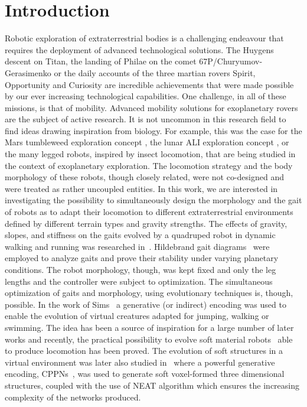 \documentclass{sig-alternate}
\begin{document}
\section{Introduction}
Robotic exploration of extraterrestrial bodies is a challenging endeavour that requires the deployment of advanced technological solutions. The Huygens descent on Titan, the landing of Philae on the comet 67P/Churyumov-Gerasimenko or the daily accounts of the three martian rovers Spirit, Opportunity and Curiosity are incredible achievements that were made possible by our ever increasing technological capabilities. One challenge, in all of these missions, is that of mobility. Advanced mobility solutions for exoplanetary rovers are the subject of active research. It is not uncommon in this research field to find ideas drawing inspiration from biology. For example, this was the case for the Mars tumbleweed exploration concept \cite{antol2003low, ylikorpi2004biologically}, the lunar ALI exploration concept \cite{clark2005ali}, or the many legged robots, inspired by insect locomotion, that are being studied in the context of exoplanetary exploration. The locomotion strategy and the body morphology of these robots, though closely related, were not co-designed and were treated as rather uncoupled entities. In this work, we are interested in investigating the possibility to simultaneously design the morphology and the gait of robots as to adapt their locomotion to different extraterrestrial environments defined by different terrain types and gravity strengths. The effects of gravity, slopes, and stiffness on the gaits evolved by a quadruped robot in dynamic walking and running was researched in~\cite{papadopoulos2013ariadna, kontolatisquadruped}. Hildebrand gait diagrams~\cite{Hildebrand1989-HILVLA} were employed to analyze gaits and prove their stability under varying planetary conditions. The robot morphology, though, was kept fixed and only the leg lengths and the controller were subject to optimization. The simultaneous optimization of gaits and morphology, using evolutionary techniques is, though, possible. In the work of Sims~\cite{sims1994evolving} a generative (or indirect) encoding was used to enable the evolution of virtual creatures adapted for jumping, walking or swimming. The idea has been a source of inspiration for a large number of later works and recently, the practical possibility to evolve soft material robots~\cite{hiller2012automatic} able to produce locomotion has been proved. The evolution of soft structures in a virtual environment was later also studied in~\cite{cheney2013unshackling} where a powerful generative encoding, CPPNs~\cite{stanley2007compositional}, was used to generate soft voxel-formed three dimensional structures, coupled with the use of NEAT algorithm which ensures the increasing complexity of the networks produced.  
\end{document}
